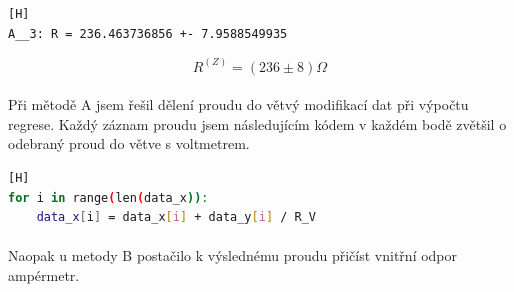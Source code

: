 \documentclass[a4paper,11pt]{article}
\begin{document}
\begin{lstlisting}[language=Bash][H]
A__3: R = 236.463736856 +- 7.9588549935\end{lstlisting}

    \begin{equation}
        R^{(Z)} = (236 \pm 8) \Omega
    \end{equation}

    \paragraph{} Při mětodě A jsem řešil dělení proudu do větvý 
    modifikací dat při výpočtu regrese. Každý záznam proudu jsem
    následujícím kódem v každém bodě zvětšil o odebraný proud
    do větve s voltmetrem.
    

\begin{lstlisting}[language=Bash][H]
for i in range(len(data_x)):
    data_x[i] = data_x[i] + data_y[i] / R_V\end{lstlisting}

    \paragraph{} Naopak u metody B postačilo k výslednému proudu
    přičíst vnitřní odpor ampérmetr.
\end{document}
